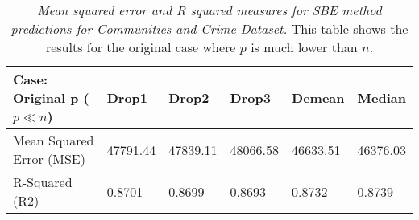 \begin{table}[h!]
\renewcommand{\arraystretch}{1.5}
\centering
\begin{tabular}{||l l l l l l||} 
 \hline
 \hline
 Case: Original p ($p \ll n$) & Drop1 & Drop2 & Drop3 & Demean & Median \\ [0.5ex] 
 \hline \hline
 Mean Squared Error (MSE) & 47791.44 & 47839.11 & 48066.58 & 46633.51 & 46376.03 \\ 
 R-Squared (R2) & 0.8701 & 0.8699 & 0.8693 & 0.8732 & 0.8739 \\
 \hline \hline
\end{tabular}
\caption{\textit{Mean squared error and R squared measures for SBE method predictions for Communities and Crime Dataset.} This table shows the results for the original case where $p$ is much lower than $n$.}
\label{table:1}
\end{table}


